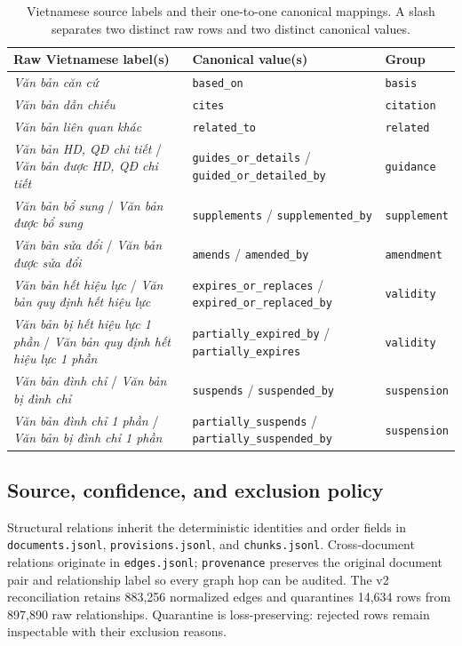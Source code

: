 \begin{table}[t]
\centering
\scriptsize
\caption{Vietnamese source labels and their one-to-one canonical mappings. A slash separates two distinct raw rows and two distinct canonical values.}
\label{tab:appendix-raw-edge-map}
\begin{tabular}{p{}p{}p{}}
\toprule
\textbf{Raw Vietnamese label(s)} & \textbf{Canonical value(s)} & \textbf{Group} \\
\midrule
\textit{Văn bản căn cứ} & \texttt{based\_on} & \texttt{basis} \\
\textit{Văn bản dẫn chiếu} & \texttt{cites} & \texttt{citation} \\
\textit{Văn bản liên quan khác} & \texttt{related\_to} & \texttt{related} \\
\textit{Văn bản HD, QĐ chi tiết} / \textit{Văn bản được HD, QĐ chi tiết} & \texttt{guides\_or\_details} / \texttt{guided\_or\_detailed\_by} & \texttt{guidance} \\
\textit{Văn bản bổ sung} / \textit{Văn bản được bổ sung} & \texttt{supplements} / \texttt{supplemented\_by} & \texttt{supplement} \\
\textit{Văn bản sửa đổi} / \textit{Văn bản được sửa đổi} & \texttt{amends} / \texttt{amended\_by} & \texttt{amendment} \\
\textit{Văn bản hết hiệu lực} / \textit{Văn bản quy định hết hiệu lực} & \texttt{expires\_or\_replaces} / \texttt{expired\_or\_replaced\_by} & \texttt{validity} \\
\textit{Văn bản bị hết hiệu lực 1 phần} / \textit{Văn bản quy định hết hiệu lực 1 phần} & \texttt{partially\_expired\_by} / \texttt{partially\_expires} & \texttt{validity} \\
\textit{Văn bản đình chỉ} / \textit{Văn bản bị đình chỉ} & \texttt{suspends} / \texttt{suspended\_by} & \texttt{suspension} \\
\textit{Văn bản đình chỉ 1 phần} / \textit{Văn bản bị đình chỉ 1 phần} & \texttt{partially\_suspends} / \texttt{partially\_suspended\_by} & \texttt{suspension} \\
\bottomrule
\end{tabular}
\end{table}

\subsection{Source, confidence, and exclusion policy}

Structural relations inherit the deterministic identities and order fields in
\texttt{documents.jsonl}, \texttt{provisions.jsonl}, and
\texttt{chunks.jsonl}. Cross-document relations originate in
\texttt{edges.jsonl}; \texttt{provenance} preserves the original document pair
and relationship label so every graph hop can be audited. The v2 reconciliation
retains 883,256 normalized edges and quarantines 14,634 rows from 897,890 raw
relationships. Quarantine is loss-preserving: rejected rows remain inspectable
with their exclusion reasons.

